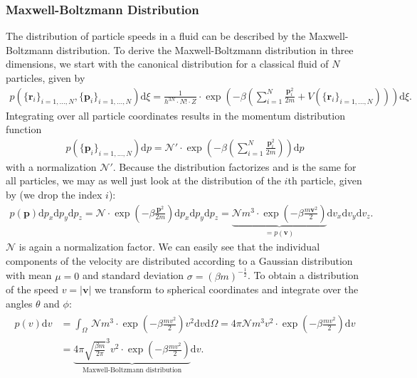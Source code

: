 \documentclass[a4paper,10pt,bibtotoc]{scrartcl}
\begin{document}
\subsubsection{Maxwell-Boltzmann Distribution}
The distribution of particle speeds in a fluid can be described by the Maxwell-Boltzmann distribution.
To derive the Maxwell-Boltzmann distribution in three dimensions, we start with the canonical distribution for a classical fluid of $N$ particles, given by
\begin{align}
p\left(\{\mathbf{r}_i\}_{i=1,...,N},\{\mathbf{p}_i\}_{i=1,...,N}\right)\mathrm{d}\xi = \frac{1}{h^{3N}\cdot N!\cdot Z}\cdot\exp\left(-\beta\left(\sum_{i=1}^{N}\frac{\mathbf{p}_i^2}{2m} + V\left(\{\mathbf{r}_i\}_{i=1,...,N}\right)\right)\right)\mathrm{d}\xi.
\end{align}
Integrating over all particle coordinates results in the momentum distribution function
\begin{align}
p\left(\{\mathbf{p}_i\}_{i=1,...,N}\right)\mathrm{d}p = \mathcal{N}'\cdot\exp\left(-\beta\left(\sum_{i=1}^{N}\frac{\mathbf{p}_i^2}{2m} \right)\right)\mathrm{d}p
\end{align}
with a normalization $\mathcal{N}'$. 
Because the distribution factorizes and is the same for all particles, we may as well just look at the distribution of the $i$th particle, given by (we drop the index $i$):
\begin{align}
p\left(\mathbf{p}\right)\mathrm{d}p_x\mathrm{d}p_y\mathrm{d}p_z = \mathcal{N}\cdot\exp\left(-\beta\frac{\mathbf{p}^2}{2m}\right)\mathrm{d}p_x\mathrm{d}p_y\mathrm{d}p_z = \underbrace{\mathcal{N}m^3\cdot\exp\left(-\beta\frac{m\mathbf{v}^2}{2}\right)}_{=p\left(\mathbf{v}\right)}\mathrm{d}v_x\mathrm{d}v_y\mathrm{d}v_z.
\end{align}
$\mathcal{N}$ is again a normalization factor.
We can easily see that the individual components of the velocity are distributed according to a Gaussian distribution with mean $\mu= 0$ and standard deviation $\sigma = \left(\beta m\right)^{-\frac{1}{2}}$.
To obtain a distribution of the speed $v=\left|\mathbf{v}\right|$ we transform to spherical coordinates and integrate over the angles $\theta$ and $\phi$:
\begin{align}
\begin{split}
p\left(v\right)\mathrm{d}v &= \int_{\Omega}\,\mathcal{N}m^3\cdot\exp\left(-\beta\frac{mv^2}{2}\right)v^2\mathrm{d}v\mathrm{d}\Omega = 4\pi\mathcal{N}m^3v^2\cdot\exp\left(-\beta\frac{mv^2}{2}\right)\mathrm{d}v\\
&=\underbrace{4\pi\sqrt{\frac{\beta m}{2\pi}}^3v^2\cdot\exp\left(-\beta\frac{mv^2}{2}\right)}_{\text{Maxwell-Boltzmann distribution}}\mathrm{d}v.
\end{split}
\end{align}
\end{document}
